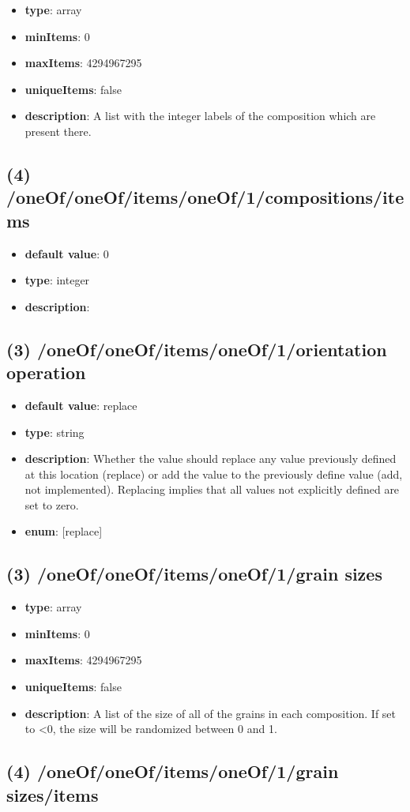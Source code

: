 \begin{itemize}[leftmargin=3em]\item {\bf type}: array
\item {\bf minItems}: 0
\item {\bf maxItems}: 4294967295
\item {\bf uniqueItems}: false
\item {\bf description}: A list with the integer labels of the composition which are present there.
\end{itemize}\subsection{(4) /oneOf/oneOf/items/oneOf/1/compositions/items}
\begin{itemize}[leftmargin=4em]\item {\bf default value}: 0
\item {\bf type}: integer
\item {\bf description}: 
\end{itemize}\subsection{(3) /oneOf/oneOf/items/oneOf/1/orientation operation}
\begin{itemize}[leftmargin=3em]\item {\bf default value}: replace
\item {\bf type}: string
\item {\bf description}: Whether the value should replace any value previously defined at this location (replace) or add the value to the previously define value (add, not implemented). Replacing implies that all values not explicitly defined are set to zero.
\item {\bf enum}: [replace]\end{itemize}\subsection{(3) /oneOf/oneOf/items/oneOf/1/grain sizes}
\begin{itemize}[leftmargin=3em]\item {\bf type}: array
\item {\bf minItems}: 0
\item {\bf maxItems}: 4294967295
\item {\bf uniqueItems}: false
\item {\bf description}: A list of the size of all of the grains in each composition. If set to <0, the size will be randomized between 0 and 1.
\end{itemize}\subsection{(4) /oneOf/oneOf/items/oneOf/1/grain sizes/items}
